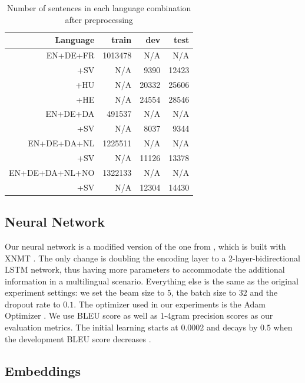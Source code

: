 \documentclass[thesis,fonts=libertine]{cluu}
\begin{document}
\begin{table}
  \centering
  \begin{tabular}{r|rrr}
    \hline
    \textbf{Language} & \textbf{train} & \textbf{dev} & \textbf{test} \\ [0.25ex]
    \hline\hline
    EN+DE+FR & 1013478 & N/A & N/A \\
    +SV & N/A & 9390 & 12423 \\
    +HU & N/A & 20332 & 25606 \\
    +HE & N/A & 24554 & 28546 \\
    \hline
    EN+DE+DA & 491537 & N/A & N/A \\
    +SV & N/A & 8037 & 9344 \\
    \hline
    EN+DE+DA+NL & 1225511 & N/A & N/A \\
    +SV & N/A & 11126 & 13378 \\
    \hline
    EN+DE+DA+NL+NO & 1322133 & N/A & N/A \\
    +SV & N/A & 12304 & 14430 \\
    \hline
  \end{tabular}
  \caption{Number of sentences in each language combination after preprocessing}
  \label{table:preprocessing}
\end{table}

\subsection{Neural Network}

Our neural network is a modified version of the one from \textcite{Qi:2018aa}, which is built with XNMT \parencite{Neubig:2018aa}. The only change is doubling the encoding layer to a 2-layer-bidirectional LSTM network, thus having more parameters to accommodate the additional information in a multilingual scenario. Everything else is the same as the original experiment settings: we set the beam size to $5$, the batch size to $32$ and the dropout rate to $0.1$. The optimizer used in our experiments is the Adam Optimizer \parencite{Kingma:2014aa}. We use BLEU score \parencite{papineni-etal-2002-bleu} as well as 1-4gram precision scores as our evaluation metrics. The initial learning starts at $0.0002$ and decays by $0.5$ when the development BLEU score decreases \parencite{Denkowski:2017aa}.

\subsection{Embeddings}
\end{document}
